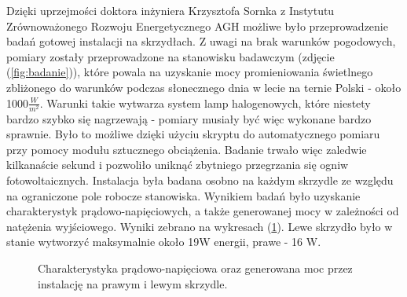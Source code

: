 \documentclass[12pt, a4paper]{article}
\let\oldref\ref
\renewcommand{\ref}[1]{(\oldref{#1})}
\begin{document}
Dzięki uprzejmości doktora inżyniera Krzysztofa Sornka z Instytutu Zrównoważonego Rozwoju Energetycznego AGH możliwe było przeprowadzenie badań gotowej instalacji na skrzydłach. Z uwagi na brak warunków pogodowych, pomiary zostały przeprowadzone na stanowisku badawczym (zdjęcie \ref{fig:badanie}), które powala na uzyskanie mocy promieniowania świetlnego zbliżonego do warunków podczas słonecznego dnia w lecie na ternie Polski - około 1000$\frac{W}{m^2}$. Warunki takie wytwarza system lamp halogenowych, które niestety bardzo szybko się nagrzewają - pomiary musiały być więc wykonane bardzo sprawnie. Było to możliwe dzięki użyciu skryptu do automatycznego pomiaru przy pomocy modułu sztucznego obciążenia. Badanie trwało więc zaledwie kilkanaście sekund i pozwoliło uniknąć zbytniego przegrzania się ogniw fotowoltaicznych. Instalacja była badana osobno na każdym skrzydle ze względu na ograniczone pole robocze stanowiska. Wynikiem badań było uzyskanie charakterystyk prądowo-napięciowych, a także generowanej mocy w zależności od natężenia wyjściowego. Wyniki zebrano na wykresach \ref{fig:charakterystyki}. Lewe skrzydło było w stanie wytworzyć maksymalnie około 19W energii, prawe - 16 W.

\begin{figure}[ht]
    \centering
    \qquad
    \caption{Charakterystyka prądowo-napięciowa oraz generowana moc przez instalację na prawym i lewym skrzydle.}
    \label{fig:charakterystyki}
\end{figure}
\end{document}
